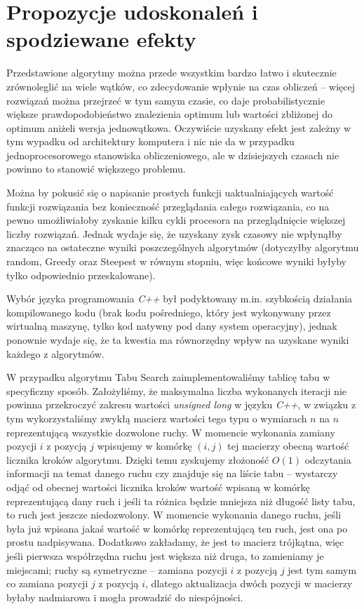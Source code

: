 \section{Propozycje udoskonaleń i spodziewane efekty}
Przedstawione algorytmy można przede wszystkim bardzo łatwo i skutecznie zrównoleglić na wiele wątków, co zdecydowanie wpłynie na czas obliczeń -- więcej rozwiązań można przejrzeć w tym samym czasie, co daje probabilistycznie większe prawdopodobieństwo znalezienia optimum lub wartości zbliżonej do optimum aniżeli wersja jednowątkowa. Oczywiście uzyskany efekt jest zależny w tym wypadku od architektury komputera i nic nie da w przypadku jednoprocesorowego stanowiska obliczeniowego, ale w dzisiejszych czasach nie powinno to stanowić większego problemu.

Można by pokusić się o napisanie prostych funkcji uaktualniających wartość funkcji rozwiązania bez konieczność przeglądania całego rozwiązania, co na pewno umożliwiałoby zyskanie kilku cykli procesora na przeglądnięcie większej liczby rozwiązań. Jednak wydaje się, że uzyskany zysk czasowy nie wpłynąłby znacząco na ostateczne wyniki poszczególnych algorytmów (dotyczyłby algorytmu random, Greedy oraz Steepest w równym stopniu, więc końcowe wyniki byłyby tylko odpowiednio przeskalowane).

Wybór języka programowania \emph{C++} był podyktowany m.in. szybkością działania kompilowanego kodu (brak kodu pośredniego, który jest wykonywany przez wirtualną maszynę, tylko kod natywny pod dany system operacyjny), jednak ponownie wydaje się, że ta kwestia ma równorzędny wpływ na uzyskane wyniki każdego z algorytmów.

W przypadku algorytmu Tabu Search zaimplementowaliśmy tablicę tabu w specyficzny sposób. Założyliśmy, że maksymalna liczba wykonanych iteracji nie powinna przekroczyć zakresu wartości \textit{unsigned long} w języku \emph{C++}, w związku z tym wykorzystaliśmy zwykłą macierz wartości tego typu o wymiarach $n$ na $n$ reprezentującą wszystkie dozwolone ruchy. W momencie wykonania zamiany pozycji $i$ z pozycją $j$ wpisujemy w komórkę $(i,j)$ tej macierzy obecną wartość licznika kroków algorytmu. Dzięki temu zyskujemy złożoność $O(1)$ odczytania informacji na temat danego ruchu czy znajduje się na liście tabu -- wystarczy odjąć od obecnej wartości licznika kroków wartość wpisaną w komórkę reprezentującą dany ruch i jeśli ta różnica będzie mniejsza niż długość listy tabu, to ruch jest jeszcze niedozwolony. W momencie wykonania danego ruchu, jeśli była już wpisana jakaś wartość w komórkę reprezentującą ten ruch, jest ona po prostu nadpisywana. Dodatkowo zakładamy, że jest to macierz trójkątna, więc jeśli pierwsza współrzędna ruchu jest większa niż druga, to zamieniamy je miejscami; ruchy są symetryczne -- zamiana pozycji $i$ z pozycją $j$ jest tym samym co zamiana pozycji $j$ z pozycją $i$, dlatego aktualizacja dwóch pozycji w macierzy byłaby nadmiarowa i mogła prowadzić do niespójności.

